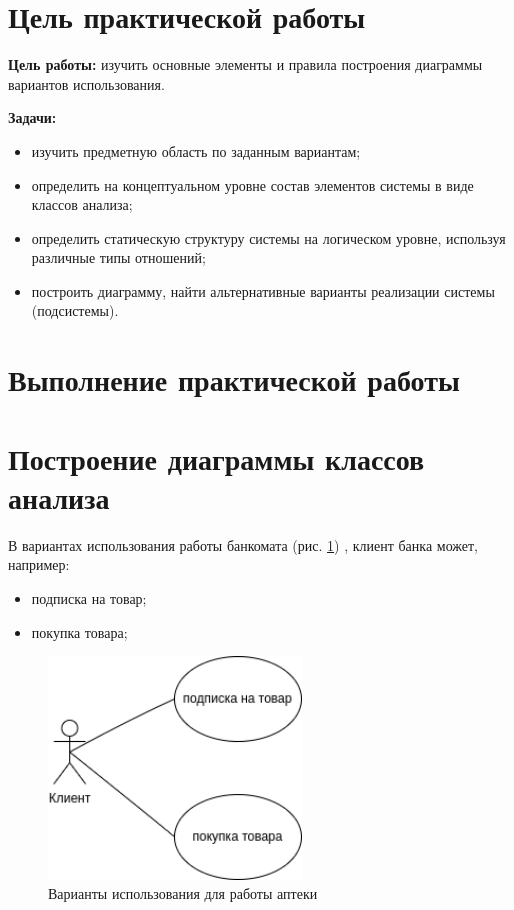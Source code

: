 \graphicspath{{./SecondTask/}} %

\section*{\LARGE Цель практической работы}

\textbf{Цель работы:} изучить основные элементы и правила построения диаграммы
вариантов использования.

\textbf{Задачи:}\par
\begin{itemize}
	\item изучить предметную область по заданным вариантам;
	\item определить на концептуальном уровне состав элементов системы в
		виде классов анализа;
	\item определить статическую структуру системы на логическом уровне,
		используя различные типы отношений;
	\item построить диаграмму, найти альтернативные варианты реализации
		системы (подсистемы).
\end{itemize}

\newpage

\section*{\LARGE Выполнение практической работы}
\section{Построение диаграммы классов анализа}
В вариантах использования работы банкомата (рис. \ref{fig:use_case})
, клиент банка может, например:
\begin{itemize}
	\item подписка на товар;
	\item покупка товара;
\end{itemize}
\begin{figure}[h!tp]
	\centering
	\includegraphics[width=0.6\textwidth]{uml_use_case.png}
	\caption{Варианты использования для работы аптеки}
	\label{fig:use_case}
\end{figure}

